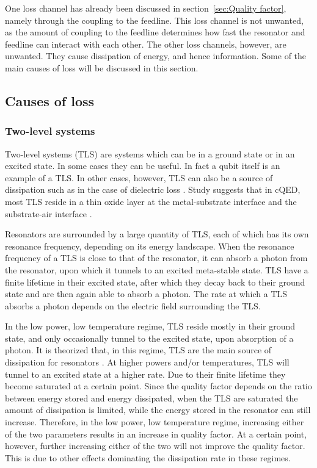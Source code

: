       One loss channel has already been discussed in section~\ref{sec:Quality factor}, namely through the coupling to the feedline. This loss channel is not unwanted, as the amount of coupling to the feedline determines how fast the resonator and feedline can interact with each other. The other loss channels, however, are unwanted. They cause dissipation of energy, and hence information. Some of the main causes of loss will be discussed in this section.


  \subsection{Causes of loss}

    \subsubsection{Two-level systems}
      \label{sec:TLS}

      Two-level systems (TLS) are systems which can be in a ground state or in an excited state. In some cases they can be useful. In fact a qubit itself is an example of a TLS. In other cases, however, TLS can also be a source of dissipation such as in the case of dielectric loss \cite{martinis2014ucsb}. Study suggests that in cQED, most TLS reside in a thin oxide layer at the metal-substrate interface and the substrate-air interface \cite{wenner2011surface}.

      Resonators are surrounded by a large quantity of TLS, each of which has its own resonance frequency, depending on its energy landscape. When the resonance frequency of a TLS is close to that of the resonator, it can absorb a photon from the resonator, upon which it tunnels to an excited meta-stable state. TLS have a finite lifetime in their excited state, after which they decay back to their ground state and are then again able to absorb a photon. The rate at which a TLS absorbs a photon depends on the electric field surrounding the TLS.

      In the low power, low temperature regime, TLS reside mostly in their ground state, and only occasionally tunnel to the excited state, upon absorption of a photon. It is theorized that, in this regime, TLS are the main source of dissipation for resonators \cite{gao2008experimental}. At higher powers and/or temperatures, TLS will tunnel to an excited state at a higher rate. Due to their finite lifetime they become saturated at a certain point. Since the quality factor depends on the ratio between energy stored and energy dissipated, when the TLS are saturated the amount of dissipation is limited, while the energy stored in the resonator can still increase. Therefore, in the low power, low temperature regime, increasing either of the two parameters results in an increase in quality factor. At a certain point, however, further increasing either of the two will not improve the quality factor. This is due to other effects dominating the dissipation rate in these regimes.

